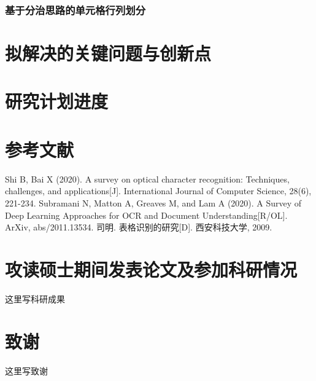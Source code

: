 \documentclass[UTF8,12pt, AutoFakeBold,fontset = founder]{ctexart}
\begin{document}
\subsubsection{基于分治思路的单元格行列划分}

\section{拟解决的关键问题与创新点}

\section{研究计划进度}

\clearpage
{
\section*{参考文献}
\vspace{-3\baselineskip} %
\fontsize{10.5pt}{12pt}\selectfont  %
\renewcommand{\baselinestretch}{1.0}  %
\setlength{\bibsep}{0pt} %
\begin{thebibliography}{00}
     Shi B, Bai X (2020). A survey on optical character recognition: Techniques, challenges, and applications[J]. International Journal of Computer Science, 28(6), 221-234. 
     Subramani N, Matton A, Greaves M, and Lam A (2020). A Survey of Deep Learning Approaches for OCR and Document Understanding[R/OL]. ArXiv, abs/2011.13534.
    司明. 表格识别的研究[D]. 西安科技大学, 2009.
\end{thebibliography}
}

\clearpage
{} %
\section*{攻读硕士期间发表论文及参加科研情况}
这里写科研成果

\clearpage
{} %
\section*{致谢}
这里写致谢
\end{document}
